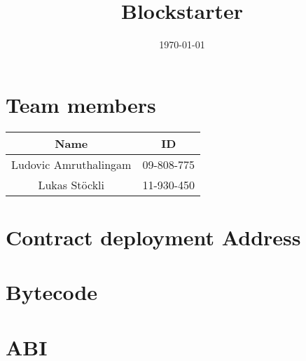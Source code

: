 \documentclass[a4]{article}
\begin{document}
\date{\today}
\title{Blockstarter}
\maketitle


\section*{Team members}
\begin{center}
	\begin{tabular}{|c|c|}
		\hline
		 Name & ID \\
		\hline
		 Ludovic Amruthalingam & 09-808-775 \\
		 Lukas Stöckli & 11-930-450 \\
		\hline
	\end{tabular}
\end{center}

\section*{Contract deployment Address}

\section*{Bytecode}

\section*{ABI}
\end{document}
